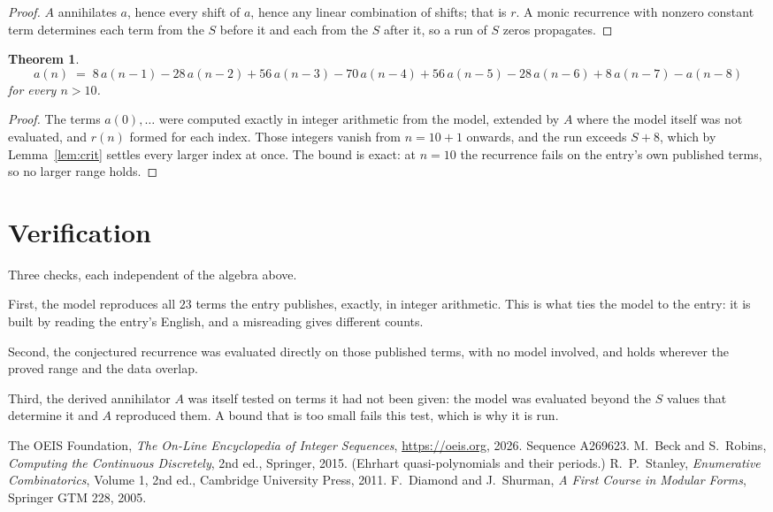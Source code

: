 \documentclass[11pt,a4paper]{article}
\theoremstyle{plain}
\newtheorem{theorem}{Theorem}
\theoremstyle{definition}
\begin{document}
\begin{proof}
$A$ annihilates $a$, hence every shift of $a$, hence any linear combination of shifts; that is
$r$. A monic recurrence with nonzero constant term determines each term from the $S$ before it
and each from the $S$ after it, so a run of $S$ zeros propagates.
\end{proof}

\begin{theorem}
\[
a(n)\;=\;8\,a(n-1) - 28\,a(n-2) + 56\,a(n-3) - 70\,a(n-4) + 56\,a(n-5) - 28\,a(n-6) + 8\,a(n-7) - a(n-8)
\]
for every $n>10$.
\end{theorem}

\begin{proof}
The terms $a(0),\dots$ were computed exactly in integer arithmetic from the model, extended by
$A$ where the model itself was not evaluated, and $r(n)$ formed for each index. Those integers
vanish from $n=10+1$ onwards, and the run exceeds $S+8$, which by
Lemma~\ref{lem:crit} settles every larger index at once. The bound is exact: at $n=10$ the recurrence fails on the entry's own published terms, so no larger range holds.
\end{proof}

\section{Verification}

Three checks, each independent of the algebra above.

First, the model reproduces all $23$ terms the entry publishes, exactly, in integer
arithmetic. This is what ties the model to the entry: it is built by reading the entry's
English, and a misreading gives different counts.

Second, the conjectured recurrence was evaluated directly on those published terms, with no
model involved, and holds wherever the proved range and the data overlap.

Third, the derived annihilator $A$ was itself tested on terms it had not been given: the model
was evaluated beyond the $S$ values that determine it and $A$ reproduced them. A bound that is
too small fails this test, which is why it is run.

\begin{thebibliography}{9}
 The OEIS Foundation, \emph{The On-Line Encyclopedia of Integer
Sequences}, \url{https://oeis.org}, 2026. Sequence A269623.
 M.~Beck and S.~Robins, \emph{Computing the Continuous Discretely},
2nd ed., Springer, 2015. (Ehrhart quasi-polynomials and their periods.)
 R.~P.~Stanley, \emph{Enumerative Combinatorics}, Volume 1, 2nd ed.,
Cambridge University Press, 2011.
 F.~Diamond and J.~Shurman, \emph{A First Course in Modular Forms},
Springer GTM 228, 2005.
\end{thebibliography}
\end{document}
